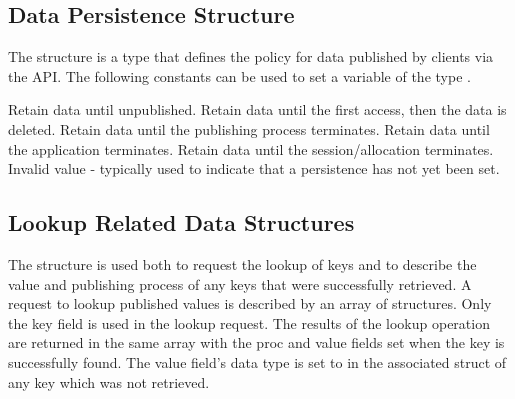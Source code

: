 \subsection{Data Persistence Structure}
\label{chap:pub:types:persist}

The  structure is a  type that defines the policy for data published by clients via the  \ac{API}.
The following constants can be used to set a variable of the type .

\begin{constantdesc}
%
Retain data until unpublished.
%
Retain data until the first access, then the data is deleted.
%
Retain data until the publishing process terminates.
%
Retain data until the application terminates.
%
Retain data until the session/allocation terminates.
%
Invalid value - typically used to indicate that a persistence has not yet been set.
%
\end{constantdesc}


\subsection{Lookup Related Data Structures}


The  structure is used both to request the lookup of keys and to describe the value and publishing process of any keys that were successfully retrieved.
A request to lookup published values is described by an array of  structures.
Only the key field is used in the lookup request.
The results of the lookup operation are returned in the same array with the proc and value fields set when the key is successfully found.
The value field's data type is set to  in the associated  struct of any key which was not retrieved.
%

